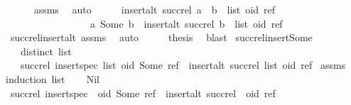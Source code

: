 \begin{isabellebody}
\ \ \ \ \isamarkupfalse%
\ assms{\isacharparenleft}{}{\isacharparenright}\ \isamarkupfalse%
\ auto\isanewline
\ \ \isamarkupfalse%
\ \isamarkupfalse%
\ {\isachardoublequoteopen}insert{\isacharunderscore}alt\ {\isacharparenleft}succ{\isacharunderscore}rel\ {\isacharparenleft}a\ {\isacharhash}\ b\ {\isacharhash}\ list{\isacharparenright}{\isacharparenright}\ {\isacharparenleft}oid{\isacharcomma}\ ref{\isacharparenright}\ {\isacharequal}\isanewline
\ \ \ \ \ \ \ \ \ \ \ \ \ \ \ \ \ {\isacharbraceleft}{\isacharparenleft}a{\isacharcomma}\ Some\ b{\isacharparenright}{\isacharbraceright}\ {\isasymunion}\ insert{\isacharunderscore}alt\ {\isacharparenleft}succ{\isacharunderscore}rel\ {\isacharparenleft}b\ {\isacharhash}\ list{\isacharparenright}{\isacharparenright}\ {\isacharparenleft}oid{\isacharcomma}\ ref{\isacharparenright}{\isachardoublequoteclose}\isanewline
\ \ \ \ \isamarkupfalse%
\ succ{\isacharunderscore}rel{\isacharunderscore}insert{\isacharunderscore}alt\ assms{\isacharparenleft}{}{\isacharparenright}\ \isamarkupfalse%
\ auto\isanewline
\ \ \isamarkupfalse%
\ \isamarkupfalse%
\ {\isacharquery}thesis\ \isamarkupfalse%
\ blast\isanewline
{}\isamarkupfalse%
%
\endisatagproof
{\isafoldproof}%
%
\isadelimproof
\isanewline
%
\endisadelimproof
\isanewline
{}\isamarkupfalse%
\ succ{\isacharunderscore}rel{\isacharunderscore}insert{\isacharunderscore}Some{\isacharcolon}\isanewline
\ \ \ {\isachardoublequoteopen}distinct\ list{\isachardoublequoteclose}\isanewline
\ \ \ {\isachardoublequoteopen}succ{\isacharunderscore}rel\ {\isacharparenleft}insert{\isacharunderscore}spec\ list\ {\isacharparenleft}oid{\isacharcomma}\ Some\ ref{\isacharparenright}{\isacharparenright}\ {\isacharequal}\ insert{\isacharunderscore}alt\ {\isacharparenleft}succ{\isacharunderscore}rel\ list{\isacharparenright}\ {\isacharparenleft}oid{\isacharcomma}\ ref{\isacharparenright}{\isachardoublequoteclose}\isanewline
%
\isadelimproof
%
\endisadelimproof
%
\isatagproof
{}\isamarkupfalse%
\ assms\ \isamarkupfalse%
{\isacharparenleft}induction\ list{\isacharparenright}\isanewline
\ \ \isamarkupfalse%
\ Nil\isanewline
\ \ \isamarkupfalse%
\ \isamarkupfalse%
\ {\isachardoublequoteopen}succ{\isacharunderscore}rel\ {\isacharparenleft}insert{\isacharunderscore}spec\ {\isacharbrackleft}{\isacharbrackright}\ {\isacharparenleft}oid{\isacharcomma}\ Some\ ref{\isacharparenright}{\isacharparenright}\ {\isacharequal}\ insert{\isacharunderscore}alt\ {\isacharparenleft}succ{\isacharunderscore}rel\ {\isacharbrackleft}{\isacharbrackright}{\isacharparenright}\ {\isacharparenleft}oid{\isacharcomma}\ ref{\isacharparenright}{\isachardoublequoteclose}\isanewline

\end{isabellebody}
